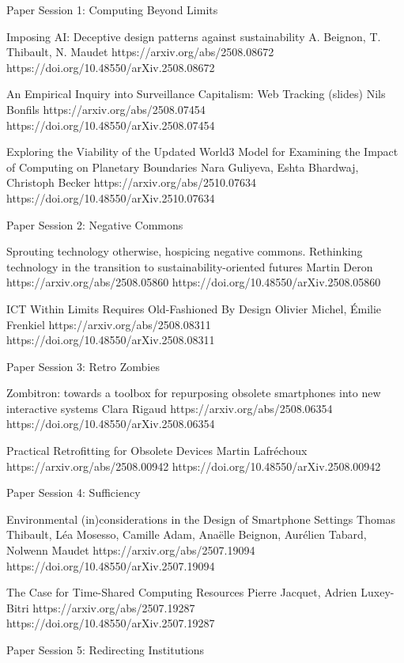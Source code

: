 
Paper Session 1: Computing Beyond Limits

	Imposing AI: Deceptive design patterns against sustainability
A. Beignon, T. Thibault, N. Maudet
        https://arxiv.org/abs/2508.08672
        https://doi.org/10.48550/arXiv.2508.08672


	An Empirical Inquiry into Surveillance Capitalism: Web Tracking (slides)
Nils Bonfils
        https://arxiv.org/abs/2508.07454
        https://doi.org/10.48550/arXiv.2508.07454

	Exploring the Viability of the Updated World3 Model for Examining the Impact of Computing on Planetary Boundaries
Nara Guliyeva, Eshta Bhardwaj, Christoph Becker
	https://arxiv.org/abs/2510.07634
	https://doi.org/10.48550/arXiv.2510.07634



Paper Session 2: Negative Commons

	Sprouting technology otherwise, hospicing negative commons. Rethinking technology in the transition to sustainability-oriented futures
Martin Deron
        https://arxiv.org/abs/2508.05860
        https://doi.org/10.48550/arXiv.2508.05860

	ICT Within Limits Requires Old-Fashioned By Design
Olivier Michel, Émilie Frenkiel
        https://arxiv.org/abs/2508.08311
        https://doi.org/10.48550/arXiv.2508.08311


Paper Session 3: Retro Zombies

	Zombitron: towards a toolbox for repurposing obsolete smartphones into new interactive systems
Clara Rigaud
        https://arxiv.org/abs/2508.06354
        https://doi.org/10.48550/arXiv.2508.06354

	Practical Retrofitting for Obsolete Devices
Martin Lafréchoux
        https://arxiv.org/abs/2508.00942
        https://doi.org/10.48550/arXiv.2508.00942


Paper Session 4: Sufficiency

	Environmental (in)considerations in the Design of Smartphone Settings
Thomas Thibault, Léa Mosesso, Camille Adam, Anaëlle Beignon, Aurélien Tabard, Nolwenn Maudet
        https://arxiv.org/abs/2507.19094
        https://doi.org/10.48550/arXiv.2507.19094

	The Case for Time-Shared Computing Resources
Pierre Jacquet, Adrien Luxey-Bitri
        https://arxiv.org/abs/2507.19287
        https://doi.org/10.48550/arXiv.2507.19287


Paper Session 5: Redirecting Institutions

